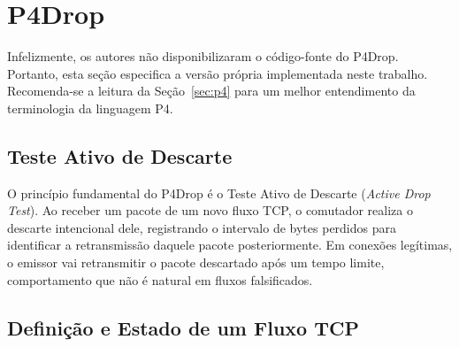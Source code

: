 \documentclass[12pt]{article}
\begin{document}


\section{P4Drop}
\label{sec:p4drop}

Infelizmente, os autores não disponibilizaram o código-fonte do P4Drop.
Portanto, esta seção especifica a versão própria implementada neste trabalho.
Recomenda-se a leitura da Seção~\ref{sec:p4} para um melhor entendimento da terminologia da linguagem P4.

\subsection{Teste Ativo de Descarte}

O princípio fundamental do P4Drop é o Teste Ativo de Descarte (\textit{Active Drop Test}).
Ao receber um pacote de um novo fluxo TCP, o comutador realiza o descarte intencional dele,
registrando o intervalo de bytes perdidos para identificar a retransmissão daquele pacote posteriormente.
Em conexões legítimas, o emissor vai retransmitir o pacote descartado após um tempo limite,
comportamento que não é natural em fluxos falsificados.

\subsection{Definição e Estado de um Fluxo TCP}
\end{document}
